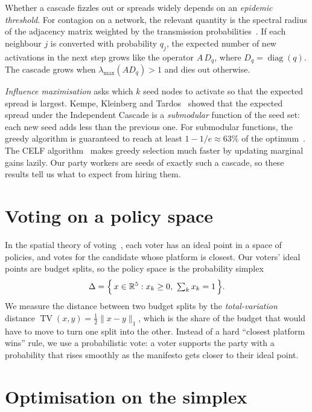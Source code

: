 \documentclass[11pt,a4paper,oneside]{report}
\newcommand{\simplex}{\Delta}
\newcommand{\TV}{\operatorname{TV}}
\newcommand{\R}{\mathbb{R}}
\begin{document}
Whether a cascade fizzles out or spreads widely depends on an \emph{epidemic threshold}. For contagion on a
network, the relevant quantity is the spectral radius of the adjacency matrix weighted by the transmission
probabilities~\cite{chakrabarti2008,pastor2015}. If each neighbour $j$ is converted with probability $q_j$,
the expected number of new activations in the next step grows like the operator $A\,D_q$, where
$D_q=\operatorname{diag}(q)$. The cascade grows when $\lambda_{\max}(A D_q) > 1$ and dies out otherwise.

\emph{Influence maximisation} asks which $k$ seed nodes to activate so that the expected spread is largest.
Kempe, Kleinberg and Tardos~\cite{kempe2003} showed that the expected spread under the Independent Cascade
is a \emph{submodular} function of the seed set: each new seed adds less than the previous one. For
submodular functions, the greedy algorithm is guaranteed to reach at least $1-1/e\approx 63\%$ of the
optimum~\cite{nemhauser1978}. The CELF algorithm~\cite{leskovec2007} makes greedy selection much faster by
updating marginal gains lazily. Our party workers are seeds of exactly such a cascade, so these results
tell us what to expect from hiring them.

\section{Voting on a policy space}

In the spatial theory of voting~\cite{downs1957,enelow1984}, each voter has an ideal point in a space of
policies, and votes for the candidate whose platform is closest. Our voters' ideal points are budget
splits, so the policy space is the probability simplex
\begin{equation}
  \simplex = \Bigl\{\, x \in \R^5 : x_k \ge 0,\ \textstyle\sum_{k} x_k = 1 \,\Bigr\}.
\end{equation}
We measure the distance between two budget splits by the \emph{total-variation} distance
$\TV(x,y)=\tfrac12\lVert x-y\rVert_1$, which is the share of the budget that would have to move to turn
one split into the other. Instead of a hard ``closest platform wins'' rule, we use a probabilistic vote: a
voter supports the party with a probability that rises smoothly as the manifesto gets closer to their
ideal point.

\section{Optimisation on the simplex}
\end{document}
